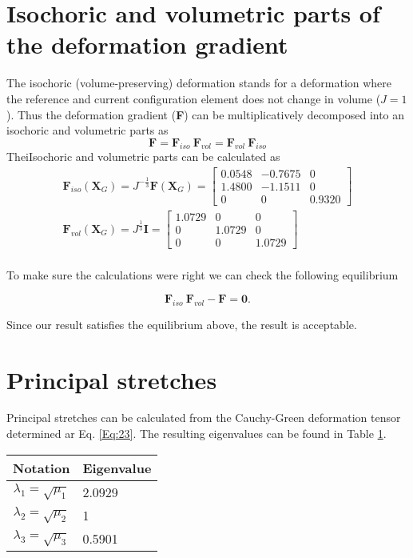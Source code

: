 \documentclass[12pt]{article}
\begin{document}
\section{Isochoric and volumetric parts of the deformation gradient}
The isochoric (volume-preserving) deformation stands for a deformation where the reference and current configuration element does not change in volume ($J=1$). 
Thus the deformation gradient (\textbf{F}) can be multiplicatively decomposed into an isochoric and volumetric
parts as 
\begin{equation}
  \textbf{F} = \textbf{F}_{iso} ~ \textbf{F}_{vol} = \textbf{F}_{vol} ~ \textbf{F}_{iso}
\end{equation} 
TheiIsochoric and volumetric parts can be calculated as
\begin{gather}
  \textbf{F}_{iso} (\textbf{X}_G) = J^{-\frac{1}{3}} \textbf{F}(\textbf{X}_G) = \begin{bmatrix}
    0.0548 & -0.7675 & 0 \\
    1.4800 & -1.1511 & 0 \\
    0 & 0 & 0.9320
  \end{bmatrix} \\
  \textbf{F}_{vol} (\textbf{X}_G) = J^{\frac{1}{3}} \textbf{I} = \begin{bmatrix}
    1.0729 & 0 & 0 \\
    0 & 1.0729 & 0 \\
    0 & 0 & 1.0729
  \end{bmatrix} \\
\end{gather}

To make sure the calculations were right we can check the following equilibrium

\begin{equation}
  \textbf{F}_{iso} ~ \textbf{F}_{vol} - \textbf{F} = \textbf{0} \! .
\end{equation}

Since our result satisfies the equilibrium above, the result is acceptable.
\section{Principal stretches}
Principal stretches can be calculated from the Cauchy-Green deformation tensor determined ar Eq. \ref{Eq:23}. The resulting eigenvalues can be found in Table \ref{table:eig}.

\begin{table}[ht!]
  \begin{center}
    \label{table:eig}
  \begin{tabular}{cl}
  Notation                   & Eigenvalue \\ \hline
  $\lambda_1 = \sqrt{\mu_1}$ & 2.0929         \\
  $\lambda_2 = \sqrt{\mu_2}$ & 1         \\
  $\lambda_3 = \sqrt{\mu_3}$ & 0.5901         
  \end{tabular}
  \end{center}
\end{table}
\end{document}
